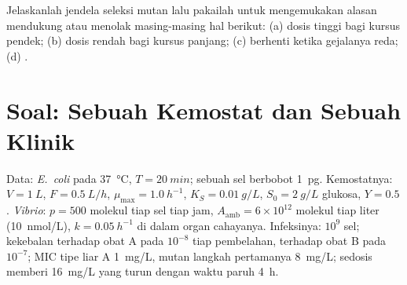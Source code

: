 \begin{exercise}[$\star\star\star$]\label{exo:b3:bacteriology:12}
Jelaskanlah jendela seleksi mutan lalu pakailah untuk mengemukakan alasan
mendukung atau menolak masing-masing hal berikut: (a) dosis tinggi bagi kursus
pendek; (b) dosis rendah bagi kursus panjang; (c) berhenti ketika gejalanya
reda; (d) .
\end{exercise}

\section{Soal: Sebuah Kemostat dan Sebuah Klinik}

\begin{problem}
\label{pb:b3:bacteriology:1}
Data: \emph{E.~coli} pada \qty{37}{\celsius}, $T = \qty{20}{min}$; sebuah sel
berbobot \qty{1}{pg}. Kemostatnya: $V = \qty{1}{L}$, $F = \qty{0.5}{L/h}$,
$\mu_{\max} = \qty{1.0}{h^{-1}}$, $K_{S} = \qty{0.01}{g/L}$, $S_{0} =
\qty{2}{g/L}$ glukosa, $Y = 0.5$. \emph{Vibrio}: $p = 500$ molekul
 tiap sel tiap jam, $A_{\text{amb}} = 6\times 10^{12}$
molekul tiap liter (\qty{10}{nmol/L}), $k = \qty{0.05}{h^{-1}}$ di dalam organ
cahayanya. Infeksinya: $10^{9}$ sel; kekebalan terhadap obat A pada
$10^{-8}$ tiap pembelahan, terhadap obat B pada $10^{-7}$; MIC tipe liar A
\qty{1}{mg/L}, mutan langkah pertamanya \qty{8}{mg/L}; sedosis memberi
\qty{16}{mg/L} yang turun dengan waktu paruh \qty{4}{h}.


\end{problem}
